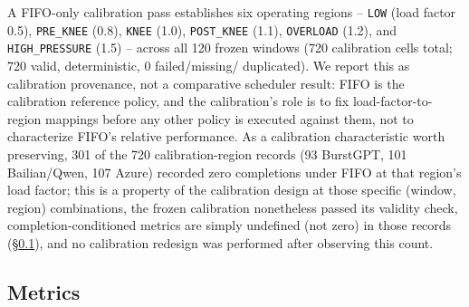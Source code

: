 A FIFO-only calibration pass establishes six operating regions --
\texttt{LOW} (load factor 0.5), \texttt{PRE\_KNEE} (0.8), \texttt{KNEE}
(1.0), \texttt{POST\_KNEE} (1.1), \texttt{OVERLOAD} (1.2), and
\texttt{HIGH\_PRESSURE} (1.5) -- across all 120 frozen windows (720
calibration cells total; 720 valid, deterministic, 0 failed/missing/
duplicated). We report this as calibration provenance, not a comparative
scheduler result: FIFO is the calibration reference policy, and the
calibration's role is to fix load-factor-to-region mappings before any
other policy is executed against them, not to characterize FIFO's relative
performance. As a calibration characteristic worth preserving, 301 of the
720 calibration-region records (93 BurstGPT, 101 Bailian/Qwen, 107 Azure)
recorded zero completions under FIFO at that region's load factor; this is
a property of the calibration design at those specific (window, region)
combinations, the frozen calibration nonetheless passed its validity
check, completion-conditioned metrics
are simply undefined (not zero) in those records
(\S\ref{sec:metrics}), and no calibration redesign was performed after
observing this count.

\subsection{Metrics}
\label{sec:metrics}


